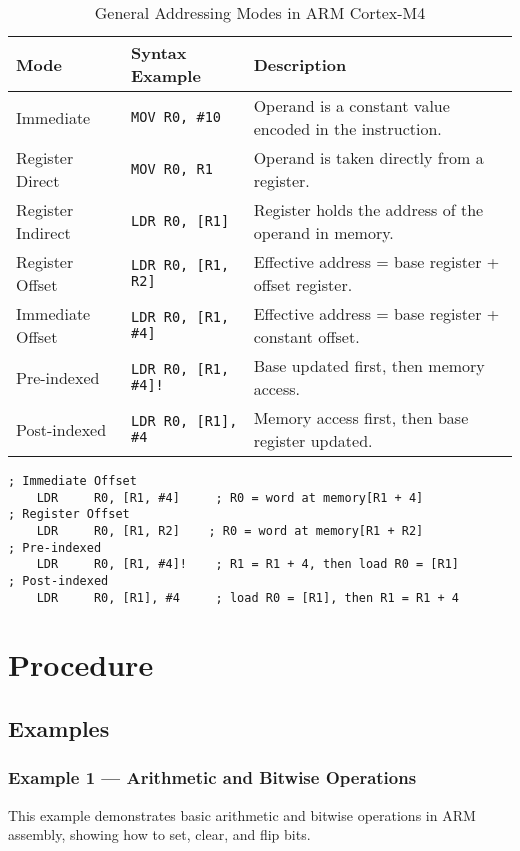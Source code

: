 \begin{table}[H]
\centering
\caption{General Addressing Modes in ARM Cortex-M4}
\small
\begin{tabularx}{\linewidth}{@{}l l X@{}}
\toprule
\textbf{Mode} & \textbf{Syntax Example} & \textbf{Description} \\
\midrule
Immediate      & \texttt{MOV R0, \#10}          & Operand is a constant value encoded in the instruction. \\
Register Direct& \texttt{MOV R0, R1}            & Operand is taken directly from a register. \\
Register Indirect & \texttt{LDR R0, [R1]}       & Register holds the address of the operand in memory. \\
Register Offset & \texttt{LDR R0, [R1, R2]}     & Effective address = base register + offset register. \\
Immediate Offset & \texttt{LDR R0, [R1, \#4]}   & Effective address = base register + constant offset. \\
Pre-indexed    & \texttt{LDR R0, [R1, \#4]!}    & Base updated first, then memory access. \\
Post-indexed   & \texttt{LDR R0, [R1], \#4}     & Memory access first, then base register updated. \\
\bottomrule
\end{tabularx}
\vspace{2pt}
\end{table}
\newpage
\begin{lstlisting}[caption={Examples of Offset, Pre-indexed, and Post-indexed Addressing Modes}]
; Immediate Offset
    LDR     R0, [R1, #4]     ; R0 = word at memory[R1 + 4]
; Register Offset
    LDR     R0, [R1, R2]    ; R0 = word at memory[R1 + R2]
; Pre-indexed
    LDR     R0, [R1, #4]!    ; R1 = R1 + 4, then load R0 = [R1]
; Post-indexed
    LDR     R0, [R1], #4     ; load R0 = [R1], then R1 = R1 + 4
\end{lstlisting}

\newpage
\section{Procedure}

\subsection{Examples}

\subsubsection{Example 1 --- Arithmetic and Bitwise Operations}
This example demonstrates basic arithmetic and bitwise operations in ARM assembly, showing how to set, clear, and flip bits.


